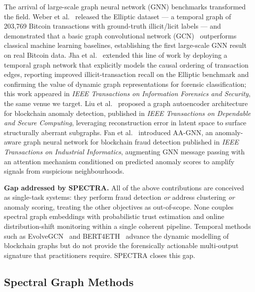\documentclass[journal]{IEEEtran}
\begin{document}
The arrival of large-scale graph neural network (GNN) benchmarks transformed
the field.  Weber et al.~\cite{Weber2019} released the Elliptic dataset --- a
temporal graph of 203,769 Bitcoin transactions with ground-truth illicit/licit
labels --- and demonstrated that a basic graph convolutional network
(GCN)~\cite{Kipf2017} outperforms classical machine learning baselines,
establishing the first large-scale GNN result on real Bitcoin data.  Jha et
al.~\cite{Jha2023} extended this line of work by deploying a temporal graph
network that explicitly models the causal ordering of transaction edges,
reporting improved illicit-transaction recall on the Elliptic benchmark and
confirming the value of dynamic graph representations for forensic
classification; this work appeared in \emph{IEEE Transactions on Information
Forensics and Security}, the same venue we target.  Liu et al.~\cite{Liu2024}
proposed a graph autoencoder architecture for blockchain anomaly detection,
published in \emph{IEEE Transactions on Dependable and Secure Computing},
leveraging reconstruction error in latent space to surface structurally
aberrant subgraphs.  Fan et al.~\cite{Fan2024} introduced AA-GNN, an
anomaly-aware graph neural network for blockchain fraud detection published in
\emph{IEEE Transactions on Industrial Informatics}, augmenting GNN message
passing with an attention mechanism conditioned on predicted anomaly scores to
amplify signals from suspicious neighbourhoods.

\smallskip
\noindent\textbf{Gap addressed by SPECTRA.}
All of the above contributions are conceived as single-task systems: they
perform fraud detection \emph{or} address clustering \emph{or} anomaly scoring,
treating the other objectives as out-of-scope.  None couples spectral graph
embeddings with probabilistic trust estimation and online distribution-shift
monitoring within a single coherent pipeline.  Temporal methods such as
EvolveGCN~\cite{Pareja2020} and BERT4ETH~\cite{He2023} advance the dynamic
modelling of blockchain graphs but do not provide the forensically actionable
multi-output signature that practitioners require.  SPECTRA closes this gap.

\subsection{Spectral Graph Methods}
\label{subsec:spectral}
\end{document}
